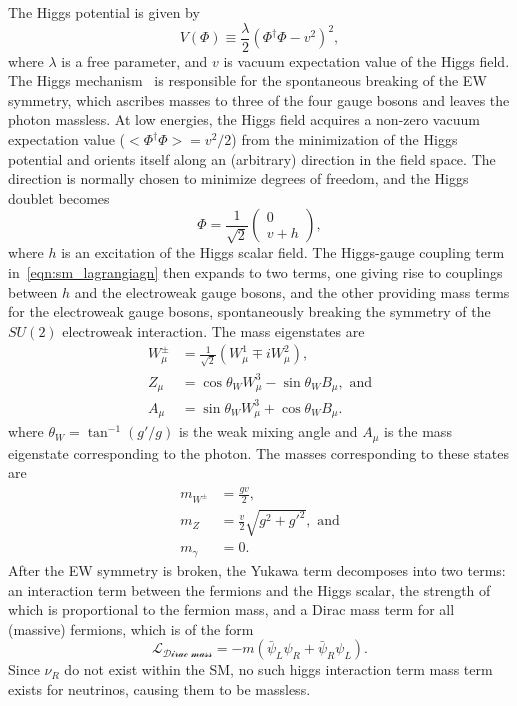 The Higgs potential is given by
\begin{equation}
    V(\Phi) \equiv \frac{\lambda}{2}(\Phi^\dagger \Phi - v^2)^2,
\end{equation}
where $\lambda$ is a free parameter, and $v$ is vacuum expectation value of the Higgs field. The Higgs mechanism~\cite{PhysRevLett.13.508, PhysRevLett.13.321} is responsible for the spontaneous breaking of the EW symmetry, which ascribes masses to three of the four gauge bosons and leaves the photon massless. At low energies, the Higgs field acquires a non-zero vacuum expectation value ($<\Phi^\dagger \Phi> = v^2/2$) from the minimization of the Higgs potential and orients itself along an (arbitrary) direction in the field space. The direction is normally chosen to minimize degrees of freedom, and the Higgs doublet becomes
\begin{equation}\label{eq:higgs_vev}
    \Phi = \frac{1}{\sqrt{2}}\left(\begin{array}{c} 0 \\ v+h \end{array}\right),
\end{equation}
where $h$ is an excitation of the Higgs scalar field. The Higgs-gauge coupling term in~\cref{eqn:sm_lagrangiagn} then expands to two terms, one giving rise to couplings between $h$ and the electroweak gauge bosons, and the other providing mass terms for the electroweak gauge bosons, spontaneously breaking the symmetry of the $SU(2)$ electroweak interaction. The mass eigenstates are
\begin{equation}
\begin{split}
    W_\mu^\pm &= \frac{1}{\sqrt{2}}(W_\mu^1 \mp iW_\mu^2), \\
    Z_\mu &= \cos \theta_W W_\mu^3 - \sin \theta_W B_\mu,\text{ and} \\
    A_\mu &= \sin \theta_W W_\mu^3 + \cos \theta_W B_\mu.
\end{split}
\end{equation}
where $\theta_W=\tan^{-1}(g'/g)$ is the weak mixing angle and $A_\mu$ is the mass eigenstate corresponding to the photon. The masses corresponding to these states are
\begin{equation}
\begin{split}
m_{W^\pm} &= \frac{gv}{2}, \\
m_Z &= \frac{v}{2}\sqrt{g^2 + g'^2}, \text{ and} \\
m_\gamma &= 0.
\end{split}
\end{equation}
After the EW symmetry is broken, the Yukawa term decomposes into two terms: an interaction term between the fermions and the Higgs scalar, the strength of which is proportional to the fermion mass, and a Dirac mass term for all (massive) fermions, which is of the form
\begin{equation}
    \mathcal{L_\text{Dirac mass}} = -m (\bar{\psi}_L\psi_R + \bar{\psi}_R\psi_L).
\end{equation}
Since $\nu_R$ do not exist within the SM, no such higgs interaction term mass term exists for neutrinos, causing them to be massless.

